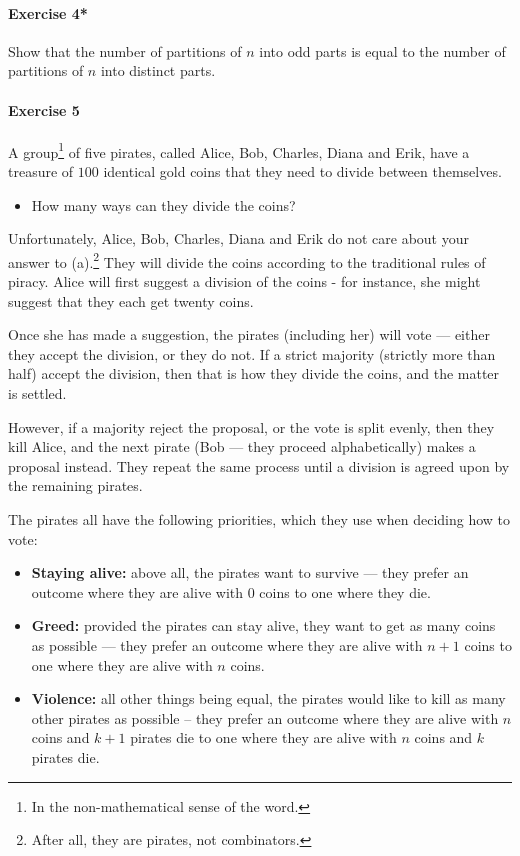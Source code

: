 \documentclass[a4paper,12pt]{article}
\begin{document}
\paragraph{Exercise 4*}  Show that the number of partitions of $n$ into odd parts is equal to the number of partitions of $n$ into distinct parts.

\paragraph{Exercise 5}   A group\footnote{In the non-mathematical sense of the word.} of five pirates, called Alice, Bob, Charles, Diana and Erik, have a treasure of $100$ identical gold coins that they need to divide between themselves.
\begin{itemize}
	\item[(a)] How many ways can they divide the coins?
\end{itemize}
Unfortunately, Alice, Bob, Charles, Diana and Erik do not care about your answer to (a).\footnote{After all, they are pirates, not combinators.}  They will divide the coins according to the traditional rules of piracy.  Alice will first suggest a division of the coins - for instance, she might suggest that they each get twenty coins.

Once she has made a suggestion, the pirates (including her) will vote --- either they accept the division, or they do not.  If a strict majority (strictly more than half) accept the division, then that is how they divide the coins, and the matter is settled.

However, if a majority reject the proposal, or the vote is split evenly, then they kill Alice, and the next pirate (Bob --- they proceed alphabetically) makes a proposal instead.  They repeat the same process until a division is agreed upon by the remaining pirates.

The pirates all have the following priorities, which they use when deciding how to vote:
\begin{itemize}
	\item[1.] \textbf{Staying alive:} above all, the pirates want to survive --- they prefer an outcome where they are alive with $0$ coins to one where they die.
	\item[2.] \textbf{Greed:} provided the pirates can stay alive, they want to get as many coins as possible --- they prefer an outcome where they are alive with $n+1$ coins to one where they are alive with $n$ coins.
	\item[3.] \textbf{Violence:} all other things being equal, the pirates would like to kill as many other pirates as possible -- they prefer an outcome where they are alive with $n$ coins and $k+1$ pirates die to one where they are alive with $n$ coins and $k$ pirates die.
\end{itemize}
\end{document}

